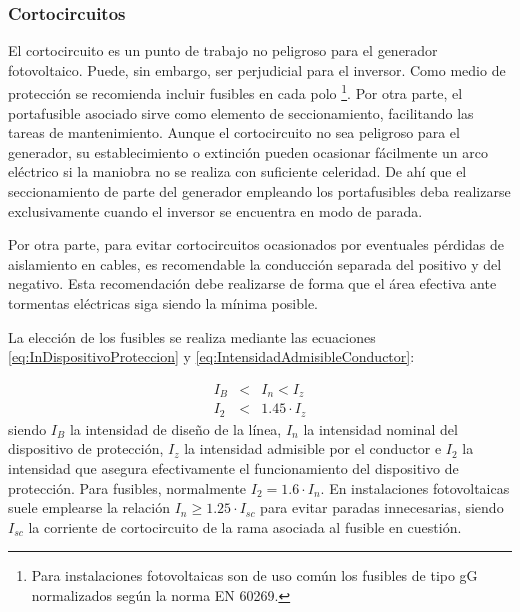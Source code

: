 \subsubsection{Cortocircuitos}

El cortocircuito es un punto de trabajo no peligroso para el generador
fotovoltaico. Puede, sin embargo, ser perjudicial para el inversor.
Como medio de protección se recomienda incluir fusibles en cada polo%
\footnote{Para instalaciones fotovoltaicas son de uso común los fusibles de
tipo gG normalizados según la norma EN 60269.%
}. Por otra parte, el portafusible asociado sirve como elemento de
seccionamiento, facilitando las tareas de mantenimiento. Aunque el
cortocircuito no sea peligroso para el generador, su establecimiento
o extinción pueden ocasionar fácilmente un arco eléctrico si la maniobra
no se realiza con suficiente celeridad. De ahí que el seccionamiento
de parte del generador empleando los portafusibles deba realizarse
exclusivamente cuando el inversor se encuentra en modo de parada. 

Por otra parte, para evitar cortocircuitos ocasionados por eventuales
pérdidas de aislamiento en cables, es recomendable la conducción separada
del positivo y del negativo. Esta recomendación debe realizarse de
forma que el área efectiva ante tormentas eléctricas siga siendo la
mínima posible.

La elección de los fusibles se realiza mediante las ecuaciones \ref{eq:InDispositivoProteccion}
y \ref{eq:IntensidadAdmisibleConductor}:

\begin{eqnarray}
I_{B} & < & I_{n}<I_{z}\label{eq:InDispositivoProteccion}\\
I_{2} & < & 1.45\cdot I_{z}\label{eq:IntensidadAdmisibleConductor}\end{eqnarray}
siendo $I_{B}$ la intensidad de diseño de la línea, $I_{n}$ la intensidad
nominal del dispositivo de protección, $I_{z}$ la intensidad admisible
por el conductor e $I_{2}$ la intensidad que asegura efectivamente
el funcionamiento del dispositivo de protección.  
Para fusibles, normalmente $I_{2}=1.6\cdot I_{n}$. En instalaciones
fotovoltaicas suele emplearse la relación $I_{n}\geq1.25\cdot I_{sc}$
para evitar paradas innecesarias, siendo $I_{sc}$ la corriente de
cortocircuito de la rama asociada al fusible en cuestión.

